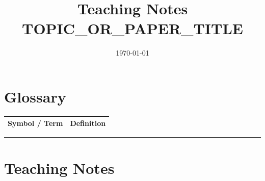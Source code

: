 \documentclass[11pt, a4paper]{article}
\title{\textbf{Teaching Notes}\\[0.3em]
       \large TOPIC\_OR\_PAPER\_TITLE}
\author{}
\date{\today}
\begin{document}
\maketitle
\thispagestyle{fancy}

\section*{Glossary}
\begin{tabular}{@{} l p{10cm} @{}}
\toprule
\textbf{Symbol / Term} & \textbf{Definition} \\
\midrule
\bottomrule
\end{tabular}

\bigskip\hrule\bigskip

\section*{Teaching Notes}

%
%
%
%
%

\end{document}

